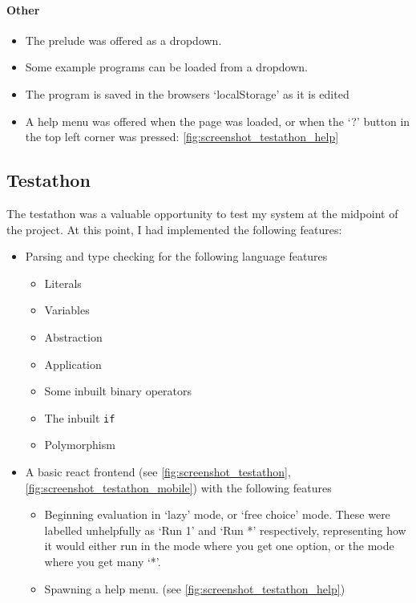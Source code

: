 \paragraph{Other}

\begin{itemize}
    \item The prelude was offered as a dropdown.
    \item Some example programs can be loaded from a dropdown.  
    \item The program is saved in the browsers `localStorage' as it is edited
    \item A help menu was offered when the page was loaded, or when the `?' button in the top left corner was pressed: \ref{fig:screenshot_testathon_help}
\end{itemize}

\subsection{Testathon}
The testathon was a valuable opportunity to test my system at the midpoint of the project. At this point, I had implemented the following features:

\begin{itemize}
    \item Parsing and type checking for the following language features
    \begin{itemize}
        \item Literals
        \item Variables
        \item Abstraction 
        \item Application
        \item Some inbuilt binary operators 
        \item The inbuilt \verb|if|
        \item Polymorphism
    \end{itemize}
\item A basic react frontend (see \ref{fig:screenshot_testathon}, \ref{fig:screenshot_testathon_mobile}) with the following features
\begin{itemize}
    \item Beginning evaluation in `lazy' mode, or `free choice' mode. These were labelled unhelpfully as `Run 1' and `Run *' respectively, representing how it would either run in the mode where you get one option, or the mode where you get many `*'.
    \item Spawning a help menu. (see \ref{fig:screenshot_testathon_help})
\end{itemize}
\end{itemize}
